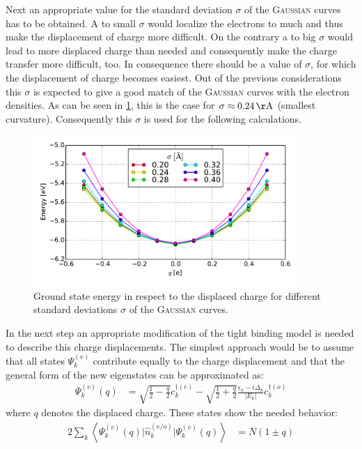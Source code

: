 Next an appropriate value for the standard deviation $\sigma$ of the \textsc{Gaussian} curves has to be obtained. A to small $\sigma$ would localize the electrons to much and thus make the displacement of charge more difficult. On the contrary a to big $\sigma$ would lead to more displaced charge than needed and consequently make the charge transfer more difficult, too. In consequence there should be a value of $\sigma$, for which the displacement of charge becomes easiest. Out of the previous considerations this $\sigma$ is expected to give a good match of the \textsc{Gaussian} curves with the electron densities. As can be seen in \cref{image_gaussian_sigmas_hydrogen}, this is the case for $\sigma \approx \unit[0.24]{\AA}$ (smallest curvature). Consequently this $\sigma$ is used for the following calculations.\\
\begin{figure}
	\centering
	\includegraphics[width = 10cm]{Images/Hydrogen/charging/gaussian_sigmas}
	\caption{Ground state energy in respect to the displaced charge for different standard deviations $\sigma$ of the \textsc{Gaussian} curves.}
	\label{image_gaussian_sigmas_hydrogen}
\end{figure}
In the next step an appropriate modification of the tight binding model is needed to describe this charge displacements. The simplest approach would be to assume that all states $\Psi_k^{(v)}$ contribute equally to the charge displacement and that the general form of the new eigenstates can be approximated as:
\begin{align}
\Psi_k^{(v)}(q) &= \sqrt{\frac{1}{2}-\frac{q}{2}}c_k^{\dagger(e)}- \sqrt{\frac{1}{2}+\frac{q}{2}}\frac{\epsilon_k - i \Delta_k}{|E_k|}c_{k}^{\dagger(o)}
\end{align}
where $q$ denotes the displaced charge. These states show the needed behavior:
\begin{align}
	2\sum_k\left\langle\Psi_k^{(v)}(q)\Big|\hat{n}_k^{(e/o)}\Big|\Psi_k^{(v)}(q)\right\rangle &= N \left(1 \pm q\right)
\end{align}
